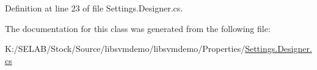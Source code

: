 Definition at line 23 of file Settings.Designer.cs.



The documentation for this class was generated from the following file:\begin{DoxyCompactItemize}
\item 
K:/SELAB/Stock/Source/libsvmdemo/libsvmdemo/Properties/\hyperlink{_settings_8_designer_8cs}{Settings.Designer.cs}\end{DoxyCompactItemize}
